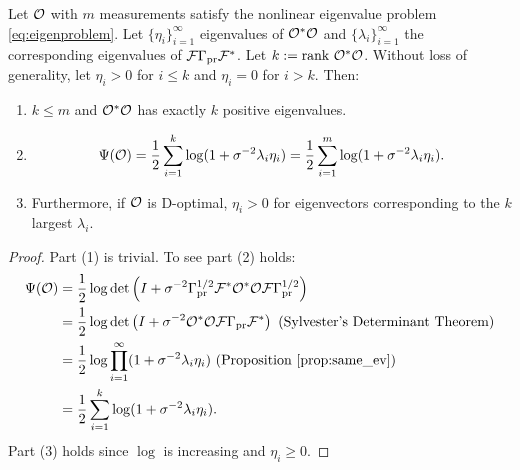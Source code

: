 \begin{proposition}\label{prop:true_target}
  Let $\mathcal{O}$ with $m$ measurements satisfy the nonlinear eigenvalue
  problem \eqref{eq:eigenproblem}. Let $\{\eta_i\}_{i=1}^{\infty}$
  eigenvalues of $\mathcal{O}^*\mathcal{O}$ and $\{\lambda_i\}_{i=1}^{\infty}$ the
  corresponding eigenvalues of $\mathcal{F} \Gamma_{\textup{pr}} \mathcal{F}^*$. Let $k:=\textup{rank}\ 
  \mathcal{O}^*\mathcal{O}$. Without loss of generality, let $\eta_i > 0$ for $i\leq
  k$ and $\eta_i = 0$ for $i > k$. Then:
  \begin{enumerate}
    \item $k \leq m$ and $\mathcal{O}^*\mathcal{O}$ has exactly $k$ positive
      eigenvalues.
    \item
      \begin{equation*}
        \tar(\obs) = \frac12 \sum_{i=1}^{k} \log (1 + \sigma^{-2}\lambda_i\eta_i) = \frac12 \sum_{i=1}^{m} \log (1 + \sigma^{-2}\lambda_i\eta_i).
      \end{equation*}
    \item Furthermore, if $\mathcal{O}$ is D-optimal, $\eta_i > 0$ for
      eigenvectors corresponding to the $k$ largest $\lambda_i$.
  \end{enumerate}
\end{proposition}
\begin{proof}
  Part (1) is trivial. To see part (2) holds: 
  \begin{align}
    \begin{split}
      \tar(\obs) &= \frac12\log \det \left (I + \sigma^{-2} \prcov^{1/2} \fwd ^* \obs^*
      \obs \fwd \prcov^{1/2}\right )\\%
      &= \frac12 \log \det \left (I + \sigma^{-2} \obs^* \obs \fwd
      \prcov\fwd^* \right ) \text{ (Sylvester's Determinant
      Theorem)}\\
      &=\frac12 \log \prod_{i=1}^{\infty} ( 1 + \sigma^{-2} \lambda_i\eta_i ) \text{ (Proposition \ref{prop:same_ev})} \\
      &=\frac12 \sum_{i=1}^{k} \log (1 + \sigma^{-2}\lambda_i\eta_i). 
    \end{split}
  \end{align}
  Part (3) holds since $\log$ is increasing and $\eta_i \geq 0$.
\end{proof}


